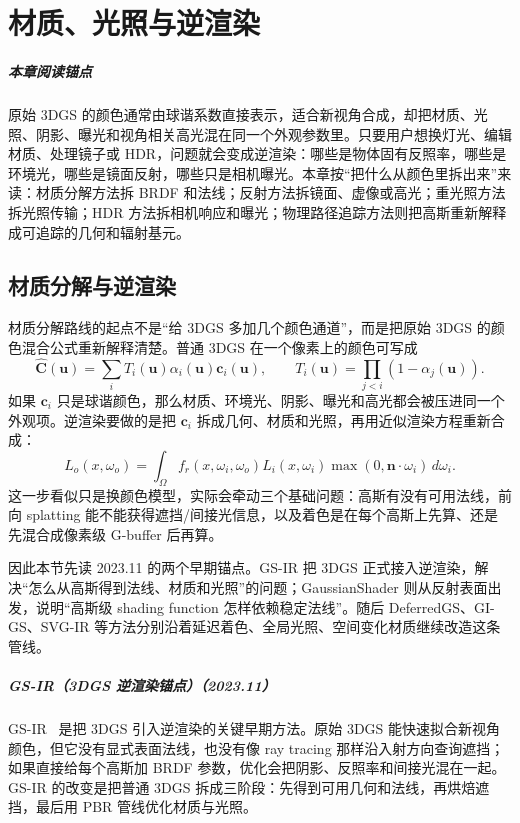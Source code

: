 \chapter{材质、光照与逆渲染}

\paragraph*{本章阅读锚点}
原始 3DGS 的颜色通常由球谐系数直接表示，适合新视角合成，却把材质、光照、阴影、曝光和视角相关高光混在同一个外观参数里。只要用户想换灯光、编辑材质、处理镜子或 HDR，问题就会变成逆渲染：哪些是物体固有反照率，哪些是环境光，哪些是镜面反射，哪些只是相机曝光。本章按“把什么从颜色里拆出来”来读：材质分解方法拆 BRDF 和法线；反射方法拆镜面、虚像或高光；重光照方法拆光照传输；HDR 方法拆相机响应和曝光；物理路径追踪方法则把高斯重新解释成可追踪的几何和辐射基元。

\section{材质分解与逆渲染}

材质分解路线的起点不是“给 3DGS 多加几个颜色通道”，而是把原始 3DGS 的颜色混合公式重新解释清楚。普通 3DGS 在一个像素上的颜色可写成
\[
  \hat{\mathbf C}(\mathbf u)=\sum_i T_i(\mathbf u)\alpha_i(\mathbf u)\mathbf c_i(\mathbf u),
  \qquad
  T_i(\mathbf u)=\prod_{j<i}\left(1-\alpha_j(\mathbf u)\right).
\]
如果 $\mathbf c_i$ 只是球谐颜色，那么材质、环境光、阴影、曝光和高光都会被压进同一个外观项。逆渲染要做的是把 $\mathbf c_i$ 拆成几何、材质和光照，再用近似渲染方程重新合成：
\[
  L_o(x,\omega_o)=\int_{\Omega} f_r(x,\omega_i,\omega_o)L_i(x,\omega_i)
  \max(0,\mathbf n\cdot\omega_i)\,d\omega_i .
\]
这一步看似只是换颜色模型，实际会牵动三个基础问题：高斯有没有可用法线，前向 splatting 能不能获得遮挡/间接光信息，以及着色是在每个高斯上先算、还是先混合成像素级 G-buffer 后再算。

因此本节先读 2023.11 的两个早期锚点。GS-IR 把 3DGS 正式接入逆渲染，解决“怎么从高斯得到法线、材质和光照”的问题；GaussianShader 则从反射表面出发，说明“高斯级 shading function 怎样依赖稳定法线”。随后 DeferredGS、GI-GS、SVG-IR 等方法分别沿着延迟着色、全局光照、空间变化材质继续改造这条管线。



\paragraph{GS-IR（3DGS 逆渲染锚点）（2023.11）}
GS-IR~\cite{2311_16473} 是把 3DGS 引入逆渲染的关键早期方法。原始 3DGS 能快速拟合新视角颜色，但它没有显式表面法线，也没有像 ray tracing 那样沿入射方向查询遮挡；如果直接给每个高斯加 BRDF 参数，优化会把阴影、反照率和间接光混在一起。GS-IR 的改变是把普通 3DGS 拆成三阶段：先得到可用几何和法线，再烘焙遮挡，最后用 PBR 管线优化材质与光照。

